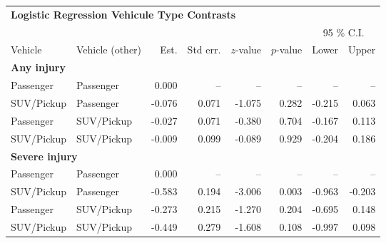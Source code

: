\begin{tabular}{llrrrrrr}
\toprule
\multicolumn{8}{l}{\normalsize\textbf{Logistic Regression Vehicule Type Contrasts}}\\\addlinespace
&&&&&&\multicolumn{2}{c}{95 \% C.I.}\\\cmidrule(l){7-8}
Vehicle  &  Vehicle (other)  &     Est.  &  Std err.  &  $z$-value  &   $p$-value  &  Lower  &  Upper \\
\midrule
\multicolumn{8}{l}{\textbf{Any injury}}\\\addlinespace
Passenger & Passenger &   0.000 &   -- &   --&  -- &          -- &           -- \\
SUV/Pickup & Passenger &  -0.076 &   0.071 &  -1.075 &  0.282 &         -0.215 &           0.063 \\
Passenger & SUV/Pickup &  -0.027 &   0.071 &  -0.380 &  0.704 &         -0.167 &           0.113 \\
SUV/Pickup & SUV/Pickup &  -0.009 &   0.099 &  -0.089 &  0.929 &         -0.204 &           0.186 \\
\midrule
\multicolumn{8}{l}{\textbf{Severe injury}}\\\addlinespace
Passenger & Passenger &   0.000 &   -- &   -- &  -- &          -- &           -- \\
SUV/Pickup & Passenger &  -0.583 &   0.194 &  -3.006 &  0.003 &         -0.963 &          -0.203 \\
Passenger & SUV/Pickup &  -0.273 &   0.215 &  -1.270 &  0.204 &         -0.695 &           0.148 \\
SUV/Pickup & SUV/Pickup &  -0.449 &   0.279 &  -1.608 &  0.108 &         -0.997 &           0.098 \\
\bottomrule
\end{tabular}